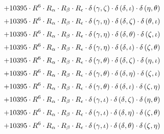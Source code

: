 \begin{subequations}
\begin{gather}
 \\[0.2em] \notag 		 + 10395 \cdot R^{6} \cdot R_{\alpha{}} \cdot R_{\beta{}} \cdot R_{\epsilon{}} \cdot \delta{}\left(\gamma{}, \zeta{}\right) \cdot \delta{}\left(\delta{}, \iota{}\right) \cdot \delta{}\left(\eta{}, \theta{}\right) 
 \\[0.2em] \notag 		 + 10395 \cdot R^{6} \cdot R_{\alpha{}} \cdot R_{\beta{}} \cdot R_{\epsilon{}} \cdot \delta{}\left(\gamma{}, \eta{}\right) \cdot \delta{}\left(\delta{}, \zeta{}\right) \cdot \delta{}\left(\theta{}, \iota{}\right) 
 \\[0.2em] \notag 		 + 10395 \cdot R^{6} \cdot R_{\alpha{}} \cdot R_{\beta{}} \cdot R_{\epsilon{}} \cdot \delta{}\left(\gamma{}, \eta{}\right) \cdot \delta{}\left(\delta{}, \theta{}\right) \cdot \delta{}\left(\zeta{}, \iota{}\right) 
 \\[0.2em] \notag 		 + 10395 \cdot R^{6} \cdot R_{\alpha{}} \cdot R_{\beta{}} \cdot R_{\epsilon{}} \cdot \delta{}\left(\gamma{}, \eta{}\right) \cdot \delta{}\left(\delta{}, \iota{}\right) \cdot \delta{}\left(\zeta{}, \theta{}\right) 
 \\[0.2em] \notag 		 + 10395 \cdot R^{6} \cdot R_{\alpha{}} \cdot R_{\beta{}} \cdot R_{\epsilon{}} \cdot \delta{}\left(\gamma{}, \theta{}\right) \cdot \delta{}\left(\delta{}, \zeta{}\right) \cdot \delta{}\left(\eta{}, \iota{}\right) 
 \\[0.2em] \notag 		 + 10395 \cdot R^{6} \cdot R_{\alpha{}} \cdot R_{\beta{}} \cdot R_{\epsilon{}} \cdot \delta{}\left(\gamma{}, \theta{}\right) \cdot \delta{}\left(\delta{}, \eta{}\right) \cdot \delta{}\left(\zeta{}, \iota{}\right) 
 \\[0.2em] \notag 		 + 10395 \cdot R^{6} \cdot R_{\alpha{}} \cdot R_{\beta{}} \cdot R_{\epsilon{}} \cdot \delta{}\left(\gamma{}, \theta{}\right) \cdot \delta{}\left(\delta{}, \iota{}\right) \cdot \delta{}\left(\zeta{}, \eta{}\right) 
 \\[0.2em] \notag 		 + 10395 \cdot R^{6} \cdot R_{\alpha{}} \cdot R_{\beta{}} \cdot R_{\epsilon{}} \cdot \delta{}\left(\gamma{}, \iota{}\right) \cdot \delta{}\left(\delta{}, \zeta{}\right) \cdot \delta{}\left(\eta{}, \theta{}\right) 
 \\[0.2em] \notag 		 + 10395 \cdot R^{6} \cdot R_{\alpha{}} \cdot R_{\beta{}} \cdot R_{\epsilon{}} \cdot \delta{}\left(\gamma{}, \iota{}\right) \cdot \delta{}\left(\delta{}, \eta{}\right) \cdot \delta{}\left(\zeta{}, \theta{}\right) 
 \\[0.2em] \notag 		 + 10395 \cdot R^{6} \cdot R_{\alpha{}} \cdot R_{\beta{}} \cdot R_{\epsilon{}} \cdot \delta{}\left(\gamma{}, \iota{}\right) \cdot \delta{}\left(\delta{}, \theta{}\right) \cdot \delta{}\left(\zeta{}, \eta{}\right) 

\end{gather}
\end{subequations}
